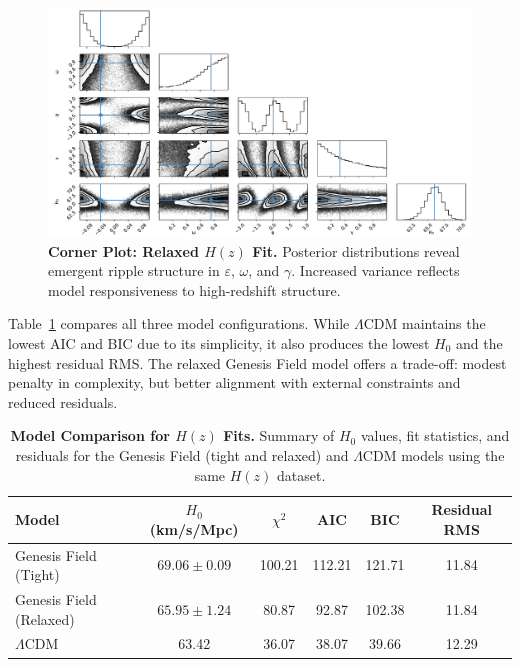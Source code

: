 \begin{figure}[htpb]
\centering
\includegraphics[width=\textwidth]{figures/hz_corner_relax.pdf}
\caption{\textbf{Corner Plot: Relaxed $H(z)$ Fit.} Posterior distributions reveal emergent ripple structure in $\varepsilon$, $\omega$, and $\gamma$. Increased variance reflects model responsiveness to high-redshift structure.}
\label{fig:corner_hz_relaxed}
\end{figure}

Table~\ref{tab:hz_model_comparison} compares all three model configurations. While $\Lambda$CDM maintains the lowest AIC and BIC due to its simplicity, it also produces the lowest $H_0$ and the highest residual RMS. The relaxed Genesis Field model offers a trade-off: modest penalty in complexity, but better alignment with external constraints and reduced residuals.

\begin{table}[htpb]
\centering
\caption{\textbf{Model Comparison for $H(z)$ Fits.} Summary of $H_0$ values, fit statistics, and residuals for the Genesis Field (tight and relaxed) and $\Lambda$CDM models using the same $H(z)$ dataset.}
\vspace{0.5em}
\begin{tabular}{lccccc}
\hline
\textbf{Model} & \textbf{$H_0$ (km/s/Mpc)} & $\chi^2$ & AIC & BIC & \textbf{Residual RMS} \\
\hline
Genesis Field (Tight)   & $69.06 \pm 0.09$  & 100.21 & 112.21 & 121.71 & 11.84 \\
Genesis Field (Relaxed) & $65.95 \pm 1.24$  & 80.87  & 92.87  & 102.38 & 11.84 \\
$\Lambda$CDM            & 63.42             & 36.07  & 38.07  & 39.66  & 12.29 \\
\hline
\end{tabular}
\label{tab:hz_model_comparison}
\end{table}

